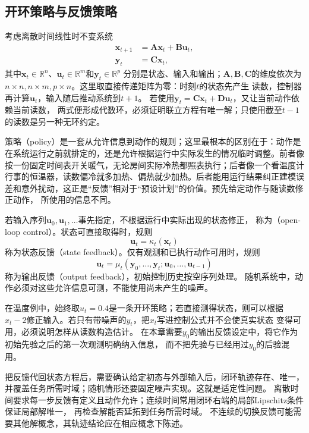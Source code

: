\subsection{开环策略与反馈策略}
考虑离散时间线性时不变系统
\begin{equation}
  \begin{aligned}
    \bm{x}_{t+1}&=\bm{A}\bm{x}_t+\bm{B}\bm{u}_t,\\
    \bm{y}_t&=\bm{C}\bm{x}_t,
  \end{aligned}
  \label{eq:control-state-space}
\end{equation}
其中$\bm{x}_t\in\mathbb R^n$、$\bm{u}_t\in\mathbb R^m$和$\bm{y}_t\in\mathbb R^p$
分别是状态、输入和输出；$\bm A,\bm B,\bm C$的维度依次为
$n\times n,n\times m,p\times n$。这里取直接传递矩阵为零：时刻$t$的状态先产生
读数，控制器再计算$\bm u_t$，输入随后推动系统到$t+1$。
若使用$\bm y_t=\bm C\bm x_t+\bm D\bm u_t$，又让当前动作依赖当前读数，
两式便形成代数环，必须证明联立方程有唯一解；只使用截至$t-1$的读数是另一种无环约定。

策略（policy）是一套从允许信息到动作的规则；这里最根本的区别在于：动作是在系统运行之前就排定的，还是允许根据运行中实际发生的情况临时调整。前者像按一份固定时间表开关暖气，无论房间实际冷热都照表执行；后者像一个看温度计行事的恒温器，读数偏冷就多加热、偏热就少加热。后者能用运行结果纠正建模误差和意外扰动，这正是“反馈”相对于“预设计划”的价值。预先给定动作与随读数修正动作，
所使用的信息不同。
\begin{definition}[开环控制与反馈控制]
\label{def:control-open-loop-state-output-feedback}
若输入序列$\bm u_0,\bm u_1,\ldots$事先指定，不根据运行中实际出现的状态修正，
称为（open-loop control）。状态可直接取得时，规则
\[
  \bm u_t=\kappa_t(\bm x_t)
\]
称为状态反馈（state feedback）。仅有观测和已执行动作可用时，规则
\[
  \bm u_t=\mu_t(\bm y_0,\ldots,\bm y_t;\bm u_0,\ldots,\bm u_{t-1})
\]
称为输出反馈（output feedback），初始控制历史按空序列处理。
随机系统中，动作必须对这些允许信息可测，不能使用尚未产生的噪声。
\end{definition}

在温度例中，始终取$u_t=0.4$是一条开环策略；若直接测得状态，则可以根据
$x_t-2$修正输入。若只有带噪声的$y_t$，把$x_t$写进控制公式并不会使真实状态
变得可用，必须说明怎样从读数构造估计。
在本章需要$y_0$的输出反馈设定中，将它作为初始先验之后的第一次观测明确纳入信息，
而不把先验与已经用过$y_0$的后验混用。

把反馈代回状态方程后，需要确认给定初态与外部输入后，闭环轨迹存在、唯一，
并覆盖任务所需时域；随机情形还要固定噪声实现。这就是适定性问题。
离散时间要求每一步反馈有定义且动作允许；连续时间常用闭环右端的局部Lipschitz条件保证局部解唯一，
再检查解能否延拓到任务所需时域。
不连续的切换反馈可能需要其他解概念，其轨迹结论应在相应概念下陈述。

